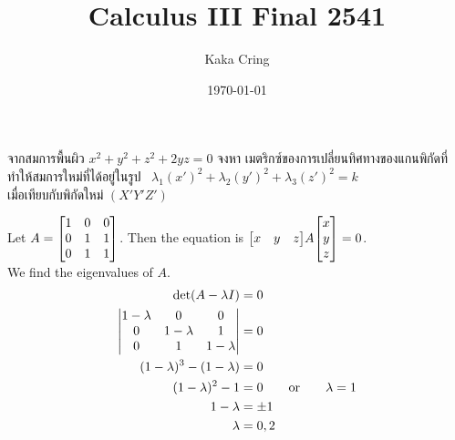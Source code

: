 \documentclass[12pt,final]{novelette} %
\title{Calculus III Final 2541}
\author{Kaka Cring}
\date{\today}
\begin{document}

\bigskip

\begin{question}
    \item {}
    \begin{question}
        \item
        จากสมการพื้นผิว $x^2 + y^2 + z^2 + 2yz = 0$
        จงหา เมตริกซ์ของการเปลี่ยนทิศทางของแกนพิกัดที่ทำให้สมการใหม่ที่ได้อยู่ในรูป \
        $\lambda_1(x')^2 + \lambda_2(y')^2 + \lambda_3(z')^2 = k$ \\
        เมื่อเทียบกับพิกัดใหม่ $(X'Y'Z')$

        \bigskip
        Let $
            A = \mqty[
                1 & 0 & 0 \\
                0 & 1 & 1 \\
                0 & 1 & 1 \\
            ]
        $.
        Then the equation is $
            \mqty[x & y & z]A\mqty[x \\ y \\ z] = 0
        $.\\[.5em]
        We find the eigenvalues of $A$.
        \begin{align*}
            \det(A - \lambda I)             & = 0                                                     \\
            \mqty|
            1 - \lambda                     & 0                                         & 0           \\
            0                               & 1 - \lambda                               & 1           \\
            0                               & 1                                         & 1 - \lambda \\
            |                               & = 0                                                     \\
            (1 - \lambda)^3 - (1 - \lambda) & = 0                                                     \\
            (1 - \lambda)^2 - 1             & = 0 \qquad \mathrm{or} \qquad \lambda = 1               \\
            1 - \lambda                     & = \pm 1                                                 \\
            \lambda                         & = 0, 2
        \end{align*}


\end{question}
\end{question}
\end{document}
